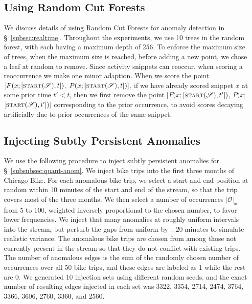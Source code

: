 \documentclass[sigconf]{acmart}
\newcommand{\timestamp}{t}
\newcommand{\stream}{\mathscr{S}}
\newcommand{\streamStart}{\textsc{start}(\stream)}
\newcommand{\pattern}{x}
\newcommand{\occs}{\mathcal{O}}
\newcommand{\freq}{F}
\newcommand{\persistence}{P}
\newcommand{\chicago}{Chicago Bike\xspace}
\begin{document}
\subsection{Using Random Cut Forests}
\label{subsec:rcf-supplement}
We discuss details of using Random Cut Forests for anomaly detection in \S~\ref{subsec:realtime}. Throughout the experiments, we use 10 trees in the random forest, with each having a maximum depth of 256. 
To enforce the maximum size of trees, when the maximum size is reached, before adding a new point, we chose a leaf at random to remove. Since activity snippets can reoccur, when scoring a reoccurrence we make one minor adaption. When we score the point $[\freq(\pattern;[\streamStart,\timestamp])$, $\persistence(\pattern;[\streamStart,\timestamp])]$, if we have already scored snippet $\pattern$ at some prior time $\timestamp' < \timestamp$, then we first remove the point $[\freq(\pattern;$$[\streamStart,\timestamp'])$, $\persistence(\pattern;$$[\streamStart,\timestamp'])]$ corresponding to the prior occurrence, to avoid scores decaying artificially due to prior occurrences of the same snippet.

\subsection{Injecting Subtly Persistent Anomalies}
\label{subsec:anomaly-injection}

We use the following procedure to inject subtly persistent anomalies for \S~\ref{subsubsec:quant-anom}. We inject bike trips into the first three months of \chicago. For each anomalous bike trip, we select a start and end position at random within 10 minutes of the start and end of the stream, so that the trip covers most of the three months. We then select a number of occurrences  $|\occs|_\pattern$ from 5 to 100, weighted inversely proportional to the chosen number, to favor lower frequencies. We inject that many anomalies at roughly uniform intervals into the stream, but perturb the gaps from uniform by $\pm 20$ minutes to simulate realistic variance. The anomalous bike trips are chosen from among those not currently present in the stream so that they do not conflict with existing trips. The number of anomalous edges is the sum of the randomly chosen number of occurrences over all 50 bike trips, and these edges are labeled as 1 while the rest are 0. We generated 10 injection sets using different random seeds, and the exact number of resulting edges injected in each set was 3322,
3354,
2714,
2474,
3764,
3366,
3606,
2760,
3360, and
2560.
\end{document}

